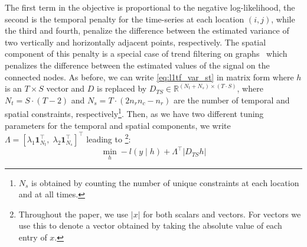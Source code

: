 \documentclass{article}
\newcommand{\attn}[1]{\textcolor{red}{TODO: #1}}
\newcommand{\one}{\mathbf{1}}
\newcommand{\given}{\;\vert\;}
\begin{document}
The first term in the objective is proportional to the negative
log-likelihood, the second is the temporal penalty for the
time-series at each location $(i,j)$, while the third and fourth,
penalize the difference between the estimated variance of two
vertically and horizontally adjacent points, respectively. The spatial
component of this
penalty is a special case of trend
filtering on graphs~\citep{wang_trend_2016} which penalizes the difference
between the estimated values of the signal on the connected
nodes. As before, we can write
\eqref{eq:l1tf_var_st} in matrix form where $h$ is an $T\times
S$ vector and $D$ is replaced by $D_{TS} \in \mathbb{R}^{(N_t+N_s) \times (T \cdot S)	}$, where $N_t=S \cdot (T-2)$ and $N_s=T \cdot (2n_rn_c-n_r)$ are the number of temporal and spatial constraints, respectively\footnote{$N_s$ is obtained by counting the number of unique constraints at each location and at all times.}. Then, as we
have two different tuning parameters for the temporal and spatial
components, we write $\Lambda =\left[\lambda_1\one_{N_t}^\top,\;
  \lambda_2\one_{N_s}^\top\right]^\top$ leading to \footnote{Throughout the paper, we use $|x|$ for both scalars and vectors. For vectors we use this to denote a vector obtained by taking the absolute value of each entry of $x$.}:
\begin{equation}
\min_h -l(y\given h)+ \Lambda^\top | D_{TS}h |
\label{eq:l1tf_var_st_mat}
\end{equation}
\end{document}
